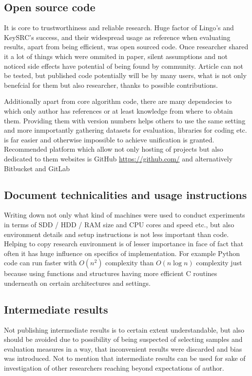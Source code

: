 \documentclass[a4paper, 12pt, oneside]{Thesis} %
\begin{document}
\subsection{Open source code}  It is core to trustworthiness and reliable research. Huge factor of Lingo's and KeySRC's success, and their widespread usage as reference when evaluating results, apart from being efficient, was open sourced code. Once researcher shared it a lot of things which were ommited in paper, silent assumptions and not noticed side effects have potential of being found by community. Article can not be tested, but published code potentially will be by many users, what is not only benefcial for them but also researcher, thanks to possible contributions. 

Additionally apart from core algorithm code, there are many dependecies to which only author has references or at least knowledge from where to obtain them. Providing them with version numbers helps others to use the same setting and more inmportantly gathering datasets for evaluation, libraries for coding etc. is far easier and otherwise impossible to achieve unification is granted. Recommended platform which allow not only hosting of projects but also dedicated to them websites is GitHub \url{https://github.com/} and alternatively Bitbucket and GitLab

\subsection{Document technicalities and usage instructions} Writing down not only what kind of machines were used to conduct experiments in terms of SDD / HDD / RAM size and CPU cores and speed etc., but also environment details and setup instructions is not less important than code. Helping to copy research environment is of lesser importance in face of fact that often it has huge influence on specifics of implementation. For example Python code can run faster with $ O(n^2) $ complexity than $ O(n\log{n}) $ complexity just because using functions and structures having more efficient C routines underneath on certain architectures and settings.

\subsection{Intermediate results} Not publishing intermediate results is to certain extent understandable, but also should be avoided due to possibility of being suspected of selecting samples and evaluation measures in a way, that inconvenient results were discarded and bias was introduced. Not to mention that intermediate results can be used for sake of investigation of other researchers reaching beyond expectations of author. 
\end{document}
